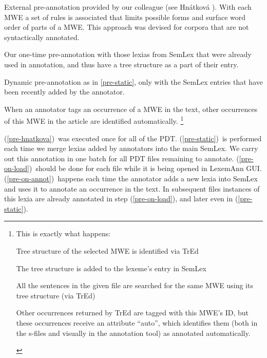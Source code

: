 \documentclass[11pt]{article}
\begin{document}
\begin{asparaenum}[A)]
\item \label{pre-hnatkova}External pre-annotation provided by our colleague (see Hnátková ). With each MWE a set of rules is associated that limits possible forms and surface word order of parts of a MWE. This approach was devised for corpora that are not syntactically annotated.
\item \label{pre-static}Our one-time pre-annotation with those lexias from SemLex that were already used in annotation, and thus have a tree structure as a part of their entry.
\item \label{pre-on-load}Dynamic pre-annotation as in \ref{pre-static}, only with the SemLex entries that have been recently added by the annotator. 
\item \label{pre-on-annot}When an annotator tags an occurrence of a MWE in the text, other occurrences of this MWE in the article are identified automatically.%
%
\footnote{This is exactly what happens:
\begin{inparaenum}[1)]
\item Tree structure of the selected MWE is identified via TrEd
\item The tree structure is added to the lexeme's entry in SemLex
\item All the sentences in the given file are searched for the same MWE using its tree structure (via TrEd)
\item Other occurrences returned by TrEd are tagged with this MWE's ID, but these occurrences receive an attribute ``auto'', which identifies them (both in the s-files and visually in the annotation tool) as annotated automatically.
\end{inparaenum}
} %
\end{asparaenum}

(\ref{pre-hnatkova})~was executed once for all of the PDT. (\ref{pre-static})~is performed each time we merge lexias added by annotators into the main SemLex. We carry out this annotation in one batch for all PDT files remaining to annotate. (\ref{pre-on-load})~should be done for each file while it is being opened in LexemAnn GUI. 
(\ref{pre-on-annot})~happens each time the annotator adds a new lexia into SemLex and uses it to annotate an occurrence in the text. In subsequent files instances of this lexia are already annotated in step (\ref{pre-on-load}), and later even in (\ref{pre-static}).
 
\end{document}
